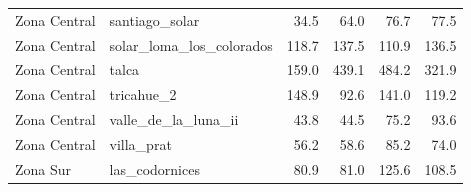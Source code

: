 {\begin{longtable}{llrrrr}
Zona Central & santiago\_solar & 34.5 & 64.0 & 76.7 & 77.5 \\
Zona Central & solar\_loma\_los\_colorados & 118.7 & 137.5 & 110.9 & 136.5 \\
Zona Central & talca & 159.0 & 439.1 & 484.2 & 321.9 \\
Zona Central & tricahue\_2 & 148.9 & 92.6 & 141.0 & 119.2 \\
Zona Central & valle\_de\_la\_luna\_ii & 43.8 & 44.5 & 75.2 & 93.6 \\
Zona Central & villa\_prat & 56.2 & 58.6 & 85.2 & 74.0 \\
Zona Sur & las\_codornices & 80.9 & 81.0 & 125.6 & 108.5 \\
\bottomrule
\end{longtable}
}